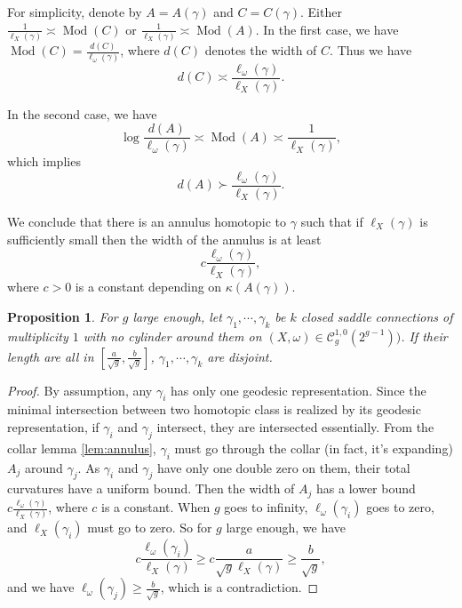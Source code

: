 \documentclass[12pt]{amsart} %
\newtheorem{proposition}[theorem]{Proposition}
\theoremstyle{definition}
\theoremstyle{remark}
\numberwithin{equation}{section}
\begin{document}
For simplicity, denote by $A=A(\gamma)$ and $C=C(\gamma)$. 
Either $\frac{1}{\ell_X(\gamma)} \asymp \operatorname{Mod}(C)$
or $\frac{1}{\ell_X(\gamma)} \asymp \operatorname{Mod}(A)$. 
In the first case, we have $\operatorname{Mod}(C)= \frac{d(C)}{\ell_\omega(\gamma)}$, where $d(C)$ denotes the width of $C$. 
Thus we have 
\begin{equation}\label{equ:flat}
 d(C) \asymp \frac{\ell_\omega(\gamma)}{\ell_X(\gamma)}.
\end{equation}

In the second case, we have 
\begin{equation}\label{equ:expanding}
    \log \frac{d(A)}{\ell_\omega(\gamma)} \asymp \operatorname{Mod}(A)\asymp \frac{1}{\ell_X(\gamma)},
\end{equation}
which implies 
$$d(A) \succ \frac{\ell_\omega(\gamma)}{\ell_X(\gamma)}.$$

We conclude that there is an annulus homotopic to $\gamma$
such that if $\ell_X(\gamma)$ is sufficiently small then the width of the annulus is at least 
$$c \frac{\ell_\omega(\gamma)}{\ell_X(\gamma)},$$
where $c>0$ is a constant depending on $\kappa(A(\gamma))$.
\begin{proposition}\label{collar disjoint}
For $g$ large enough, let $\gamma_1,\cdots,\gamma_k$ be $k$ closed saddle connections of multiplicity $1$ with no cylinder around them on $(X,\omega )\in \mathcal{C}^{1,0}_{g}(2^{g-1}))$. If their length are all in $[\frac{a}{\sqrt{g}},\frac{b}{\sqrt{g}}]$, $\gamma_1,\cdots,\gamma_k$ are disjoint.
\end{proposition}

\begin{proof}
By assumption, any $\gamma_i$ has only one geodesic representation. 
Since the minimal intersection between two homotopic class is realized by its geodesic representation, 
if $\gamma_i$ and $\gamma_j$ intersect, they are intersected essentially.
From the collar lemma \ref{lem:annulus}, $\gamma_i$ must go through the collar (in fact, it's expanding) $A_j$ around $\gamma_j$.
As $\gamma_i$ and $\gamma_j$ have only one double zero on them, their total curvatures have a uniform bound.
Then the width of $A_j$ has a lower bound $c\frac{\ell_\omega(\gamma)}{\ell_X(\gamma)}$, where $c$ is a constant.
When $g$ goes to infinity, $\ell_\omega(\gamma_i)$ goes to zero, and $\ell_X(\gamma_i)$ must go to zero. 
So for $g$ large enough, we have
$$c \frac{\ell_\omega(\gamma_i)}{\ell_X(\gamma)}\geq c\frac{a}{\sqrt{g}\ell_X(\gamma)}\geq \frac{b}{\sqrt{g}},$$
and we have $\ell_\omega(\gamma_j)\geq \frac{b}{\sqrt{g}}$, which is a contradiction.
\end{proof}
\fi
\end{document}
